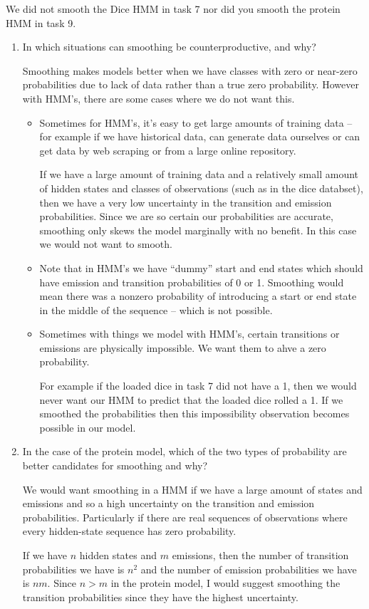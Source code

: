 \documentclass[10pt,\jkfside,a4paper]{article}
\begin{document}
We did not smooth the Dice HMM in task 7 nor did you smooth the protein
HMM in task 9.

\begin{enumerate}

\item In which situations can smoothing be counterproductive, and why?

Smoothing makes models better when we have classes with zero or near-zero probabilities 
due to lack of data rather than a true zero probability. However with HMM's, there are 
some cases where we do not want this.

\begin{itemize}

\item Sometimes for HMM's, it's easy to get large amounts of training data -- for example if we 
have historical data, can generate data ourselves or can get data by web scraping or from a large 
online repository.

If we have a 
large amount of training data and a relatively small amount of hidden states and 
classes of observations (such as in the dice databset), then we have a very low uncertainty in 
the transition and emission probabilities. Since we are so certain our probabilities are 
accurate, smoothing only skews the model marginally with no benefit. In this case we would not 
want to smooth.

\item Note that in HMM's we have ``dummy'' start and end states which should have emission and transition 
probabilities of 0 or 1. Smoothing would mean there was a nonzero probability of introducing a 
start or end state in the middle of the sequence -- which is not possible.

\item Sometimes with things we model with HMM's, certain transitions or emissions are physically impossible. 
We want them to ahve a zero probability.

For example if the loaded dice in task 7 did not have a 1, then we 
would never want our HMM to predict that the loaded dice rolled a 1.
If we smoothed the probabilities then this impossibility observation becomes possible in our model.

\end{itemize}

\item In the case of the protein model, which of the two types of probability are
better candidates for smoothing and why?

We would want smoothing in a HMM if we have a large amount of states and emissions and so a 
high uncertainty on the transition and emission probabilities. Particularly if there are 
real sequences of observations where every hidden-state sequence has zero probability.

If we have $n$ hidden states and $m$ emissions, then the number of transition probabilities we have is 
$n^2$ and the number of emission probabilities we have is $nm$. Since $n > m$ in the protein model, I would 
suggest smoothing the transition probabilities since they have the highest uncertainty.

\end{enumerate}
\end{document}
